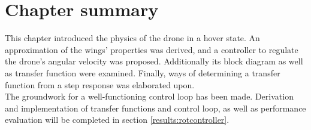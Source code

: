 \section{Chapter summary}
This chapter introduced the physics of the drone in a hover state. An approximation of the wings' properties was derived, and a controller to regulate the drone's angular velocity was proposed. Additionally its block diagram as well as transfer function were examined. Finally, ways of determining a transfer function from a step response was elaborated upon.\\
The groundwork for a well-functioning control loop has been made. Derivation and implementation of transfer functions and control loop, as well as performance evaluation will be completed in section \ref{results:rotcontroller}.  
